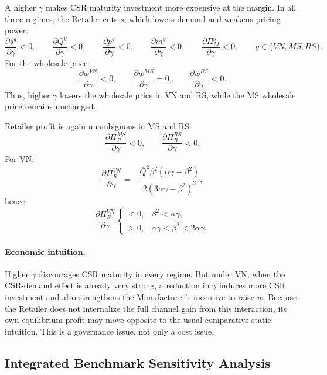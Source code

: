 A higher \(\gamma\) makes CSR maturity investment more expensive at the margin. In all three regimes,
the Retailer cuts \(s\), which lowers demand and weakens pricing power:
\[
\frac{\partial s^g}{\partial\gamma}<0,\qquad
\frac{\partial Q^g}{\partial\gamma}<0,\qquad
\frac{\partial p^g}{\partial\gamma}<0,\qquad
\frac{\partial m^g}{\partial\gamma}<0,\qquad
\frac{\partial \Pi_M^g}{\partial\gamma}<0,
\qquad g\in\{VN,MS,RS\}.
\]
For the wholesale price:
\[
\frac{\partial w^{VN}}{\partial\gamma}<0,\qquad
\frac{\partial w^{MS}}{\partial\gamma}=0,\qquad
\frac{\partial w^{RS}}{\partial\gamma}<0.
\]
Thus, higher \(\gamma\) lowers the wholesale price in VN and RS, while the MS wholesale price remains unchanged.

Retailer profit is again unambiguous in MS and RS:
\[
\frac{\partial \Pi_R^{MS}}{\partial\gamma}<0,\qquad
\frac{\partial \Pi_R^{RS}}{\partial\gamma}<0.
\]
For VN:
\[
\frac{\partial \Pi_R^{VN}}{\partial\gamma}
=
-\frac{\overline Q^2\beta^2(\alpha\gamma-\beta^2)}{2(3\alpha\gamma-\beta^2)^3},
\]
hence
\[
\frac{\partial \Pi_R^{VN}}{\partial\gamma}
\begin{cases}
<0, & \beta^2<\alpha\gamma,\\
>0, & \alpha\gamma<\beta^2<2\alpha\gamma.
\end{cases}
\]

\paragraph{Economic intuition.}
Higher \(\gamma\) discourages CSR maturity in every regime. But under VN, when the
CSR-demand effect is already very strong, a reduction in \(\gamma\) induces more CSR
investment and also strengthens the Manufacturer's incentive to raise \(w\). Because the Retailer
does not internalize the full channel gain from this interaction, its own equilibrium profit may
move opposite to the usual comparative-static intuition. This is a governance issue, not only a cost issue.

\subsection{Integrated Benchmark Sensitivity Analysis}

